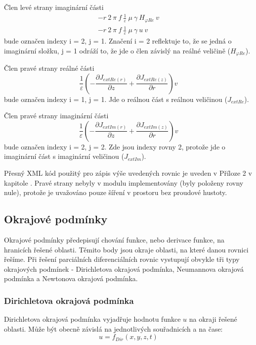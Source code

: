 \documentclass[12pt,a4paper,oneside]{article}
\numberwithin{equation}{section} %
\numberwithin{figure}{section} %
\numberwithin{table}{section} %
\begin{document}
Člen levé strany imaginární části
\begin{subequations}
\begin{gather}
- r ~ 2 ~ \pi ~ f ~ \frac{1}{\varepsilon} ~ \mu ~ \gamma ~ H _{\varphi Re} ~ v
\\
- r ~ 2 ~ \pi ~ f ~ \frac{1}{\varepsilon} ~ \mu ~ \gamma ~ u ~ v
\end{gather}
\end{subequations}
bude označen indexy i = 2, j = 1. Značení i = 2 reflektuje to, že se jedná o imaginární složku, j = 1 odráží to, že jde o člen závislý na reálné veličině ($H _{\varphi Re}$).

Člen pravé strany reálné části
\begin{equation}
\frac{1}{\varepsilon} \left( - \frac{\partial J _{extRe(r)}}{\partial z} + \frac{\partial J _{extRe(z)}}{\partial r} \right) v
\end{equation}
bude označen indexy i = 1, j = 1. Jde o reálnou část s reálnou veličinou ($J _{extRe}$). 

Člen pravé strany imaginární části
\begin{equation}
\frac{1}{\varepsilon} \left( - \frac{\partial J _{extIm(r)}}{\partial z} + \frac{\partial J _{extIm(z)}}{\partial r} \right)  v
\end{equation}
bude označen indexy i = 2, j = 2. Zde jsou indexy rovny 2, protože jde o imaginární část s imaginární veličinou ($J _{extIm}$).

Přesný XML kód použitý pro zápis výše uvedených rovnic je uveden v Příloze 2 v kapitole . Pravé strany nebyly v modulu implementovány (byly položeny rovny nule), protože je uvažováno pouze šíření v prostoru bez proudové hustoty.


\subsection{Okrajové podmínky}
Okrajové podmínky předepisují chování funkce, nebo derivace funkce, na hranicích řešené oblasti. Těmito body jsou okraje oblasti, na které danou rovnici řešíme. Při řešení parciálních diferenciálních rovnic vystupují obvykle tři typy okrajových podmínek - Dirichletova okrajová podmínka, Neumannova okrajová podmínka a Newtonova okrajová podmínka.


\subsubsection{Dirichletova okrajová podmínka}
Dirichletova okrajová podmínka vyjadřuje hodnotu funkce $u$ na okraji řešené oblasti. Může být obecně závislá na jednotlivých souřadnicích a na čase: 
\begin{equation}
u = f _{Dir} (x, y, z, t)
\end{equation}
\end{document}
